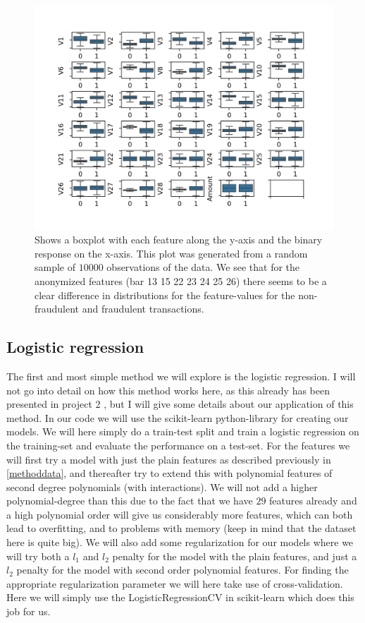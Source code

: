 \documentclass{article}
\begin{document}
\begin{figure}
	\centering
	\includegraphics[scale=0.8]{data_features_boxplot}
	\caption{Shows a boxplot with each feature along the y-axis and the
		binary response on the x-axis. This plot was generated from a random
		sample of $10 000$ observations of the data. We see that for the anonymized
		features (bar 13 15 22 23 24 25 26) there seems to be a clear difference in
		distributions for the feature-values for the non-fraudulent and fraudulent
		transactions.}
	\label{databoxplot}
\end{figure}


\subsection{Logistic regression}
The first and most simple method we will explore is the logistic regression. I
will not go into detail on how this method works here, as this already has been
presented in project 2 \cite{githubrepoproject2}, but I will give some details
about our application of this method. In our code we will use the scikit-learn
python-library for creating our models. We will here simply do a train-test
split and train a logistic regression on the training-set and evaluate the
performance on a test-set. For the features we will first try a model with just
the plain features as described previously in \ref{methoddata}, and thereafter
try to extend this with polynomial features of second degree polynomials (with
interactions). We will not add a higher polynomial-degree than this due to the
fact that we have $29$ features already and a high polynomial order will give us
considerably more features, which can both lead to overfitting, and to problems
with memory (keep in mind that the dataset here is quite big). We will also add
some regularization for our models where we will try both a $l_1$ and $l_2$
penalty for the model with the plain features, and just a $l_2$ penalty for the
model with second order polynomial features. For finding the appropriate
regularization parameter we will here take use of cross-validation.  Here we
will simply use the LogisticRegressionCV in scikit-learn which does this job for us.
\end{document}
